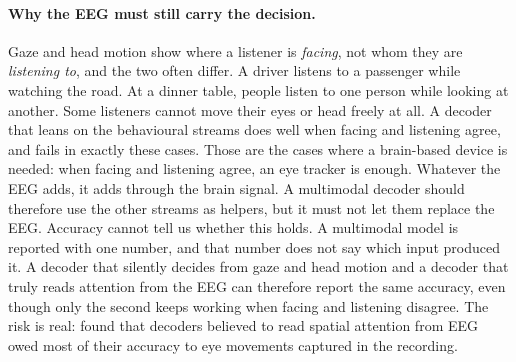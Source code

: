 \paragraph{Why the EEG must still carry the decision.}
Gaze and head motion show where a listener is \emph{facing}, not whom they are
\emph{listening to}, and the two often differ. A driver listens to a passenger
while watching the road. At a dinner table, people listen to one person while
looking at another. Some listeners cannot move their eyes or head freely at all.
A decoder that leans on the behavioural streams does well when facing and
listening agree, and fails in exactly these cases. Those are the cases where a
brain-based device is needed: when facing and listening agree, an eye tracker is
enough. Whatever the EEG adds, it adds through the brain signal. A multimodal
decoder should therefore use the other streams as helpers, but it must not let
them replace the EEG. Accuracy cannot tell us whether this holds. A multimodal
model is reported with one number, and that number does not say which input
produced it. A decoder that silently decides from gaze and head motion and a
decoder that truly reads attention from the EEG can therefore report the same
accuracy, even though only the second keeps working when facing and listening
disagree. The risk is real: \citet{rotaru2024} found that decoders believed to
read spatial attention from EEG owed most of their accuracy to eye movements
captured in the recording.

